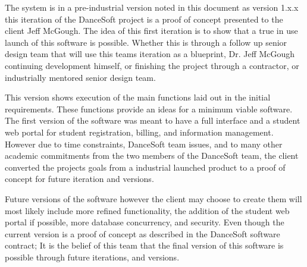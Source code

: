 The system is in a pre-industrial version noted in this document as version 1.x.x this iteration of the DanceSoft project is a proof of concept presented to the client Jeff McGough. The idea of this first iteration is to show that a true in use launch of this software is possible. Whether this is through a follow up senior design team that will use this teams iteration as a blueprint, Dr. Jeff McGough continuing development himself, or finishing the project through a contractor, or industrially mentored senior design team.

This version shows execution of the main functions laid out in the initial requirements. These functions provide an ideas for a minimum viable software. The first version of the software was meant to have a full interface and a student web portal for student registration, billing, and information management. However due to time constraints, DanceSoft team issues, and to many other academic commitments from the two members of the DanceSoft team, the client converted the projects goals from a industrial launched product to a proof of concept for future iteration and versions. 

Future versions of the software however the client may choose to create them will most likely include more refined functionality, the addition of the student web portal if possible, more database concurrency, and security. Even though the current version is a proof of concept as described in the DanceSoft software contract; It is the belief of this team that the final version of this software is possible through future iterations, and versions.